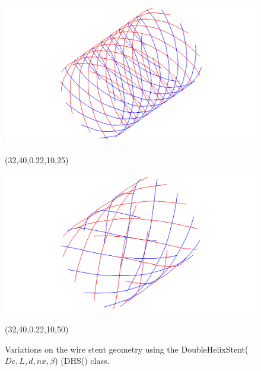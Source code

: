 \begin{figure} [H]
\begin{latexonly}
\begin{minipage} [c] [] [c]{5.5cm}
	\includegraphics [width =\textwidth] {images/WireStentD32L40d22n10b25}
	\begin{center}
	\vspace{-3ex}
	(32,40,0.22,10,25)
	\vspace{1ex}
	\end{center}
\end{minipage}
\hspace{0.3cm}
\begin{minipage} [c] [] [c] {5.5cm}
	\includegraphics [width =\textwidth] {images/WireStentD32L40d22n10b50}
	\begin{center}
	\vspace{-3ex}
	(32,40,0.22,10,50)
	\vspace{1ex}
	\end{center}
\end{minipage}
\hspace{0.3cm}
   \end{latexonly}
   \begin{htmlonly}
   \end{htmlonly} 
	\caption {Variations on the wire stent geometry using the DoubleHelixStent($De,L,d,nx,\beta$) (DHS() class.} 
	\label{param} 	
\end{figure}

